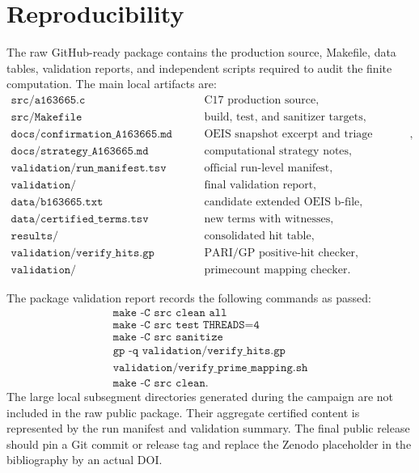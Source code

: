 \documentclass[11pt]{article}
\theoremstyle{definition}
\theoremstyle{remark}
\begin{document}
\section{Reproducibility}

The raw GitHub-ready package contains the production source, Makefile,
data tables, validation reports, and independent scripts required to
audit the finite computation.  The main local artifacts are:
\[
\begin{array}{ll}
\texttt{src/a163665.c} & \text{C17 production source},\\
\texttt{src/Makefile} & \text{build, test, and sanitizer targets},\\
\texttt{docs/confirmation\_A163665.md} & \text{OEIS snapshot excerpt and triage confirmation},\\
\texttt{docs/strategy\_A163665.md} & \text{computational strategy notes},\\
\texttt{validation/run\_manifest.tsv} & \text{official run-level manifest},\\
\texttt{validation/validation\_summary.md} & \text{final validation report},\\
\texttt{data/b163665.txt} & \text{candidate extended OEIS b-file},\\
\texttt{data/certified\_terms.tsv} & \text{new terms with witnesses},\\
\texttt{results/A163665\_campaign\_hits.tsv} & \text{consolidated hit table},\\
\texttt{validation/verify\_hits.gp} & \text{PARI/GP positive-hit checker},\\
\texttt{validation/verify\_prime\_mapping.sh} & \text{primecount mapping checker}.
\end{array}
\]

The package validation report records the following commands as passed:
\[
\begin{array}{l}
\texttt{make -C src clean all}\\
\texttt{make -C src test THREADS=4}\\
\texttt{make -C src sanitize}\\
\texttt{gp -q validation/verify\_hits.gp}\\
\texttt{validation/verify\_prime\_mapping.sh}\\
\texttt{make -C src clean}.
\end{array}
\]
The large local subsegment directories generated during the campaign are
not included in the raw public package.  Their aggregate certified
content is represented by the run manifest and validation summary.
The final public release should pin a Git commit or release tag and
replace the Zenodo placeholder in the bibliography by an actual DOI.
\end{document}
